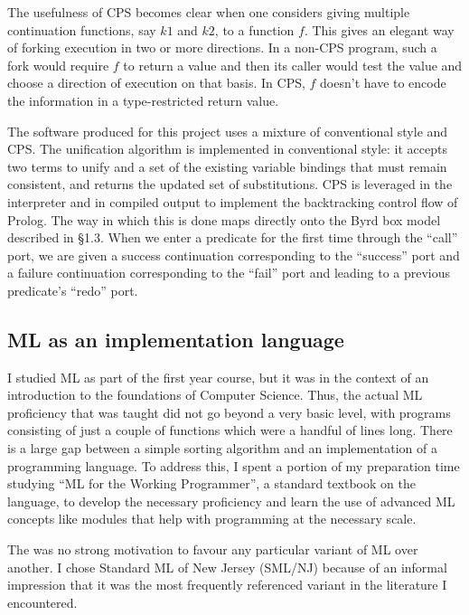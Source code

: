 \documentclass[12pt]{article}
\begin{document}
The usefulness of CPS becomes clear when one considers giving multiple continuation functions, say $k1$ and $k2$, to a function $f$. 
This gives an elegant way of forking execution in two or more directions. 
In a non-CPS program, such a fork would require $f$ to return a value and then its caller would test the value and choose a direction of execution on that basis. 
In CPS, $f$ doesn't have to encode the information in a type-restricted return value.

The software produced for this project uses a mixture of conventional style and CPS. 
The unification algorithm is implemented in conventional style: it accepts two terms to unify and a set of the existing variable bindings that must remain consistent, and returns the updated set of substitutions. 
CPS is leveraged in the interpreter and in compiled output to implement the backtracking control flow of Prolog.
The way in which this is done maps directly onto the Byrd box model described in \S1.3. When we enter a predicate for the first time through the ``call'' port, we are given a success continuation corresponding to the ``success'' port and a failure continuation corresponding to the ``fail'' port and leading to a previous predicate's ``redo'' port.

\subsection{ML as an implementation language}

I studied ML as part of the first year course, but it was in the context of an introduction to the foundations of Computer Science. 
Thus, the actual ML proficiency that was taught did not go beyond a very basic level, with programs consisting of just a couple of functions which were a handful of lines long. 
There is a large gap between a simple sorting algorithm and an implementation of a programming language. 
To address this, I spent a portion of my preparation time studying ``ML for the Working Programmer'', a standard textbook on the language, to develop the necessary proficiency and learn the use of advanced ML concepts like modules that help with programming at the necessary scale.

The was no strong motivation to favour any particular variant of ML over another.
I chose Standard ML of New Jersey (SML/NJ) because of an informal impression that it was the most frequently referenced variant in the literature I encountered.

\newpage
\end{document}
